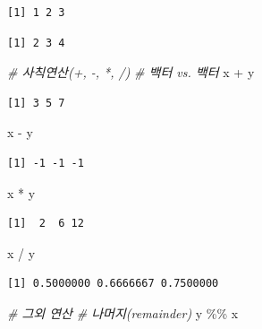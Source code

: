\documentclass[
  11pt,
]{krantz}
\newenvironment{Shaded}{\begin{snugshade}}{\end{snugshade}}
\newcommand{\CommentTok}[1]{\textcolor[rgb]{0.37,0.37,0.37}{\textit{#1}}}
\newcommand{\NormalTok}[1]{#1}
\newcommand{\SpecialCharTok}[1]{\textcolor[rgb]{0,0,0}{#1}}
\begin{document}
\begin{verbatim}
[1] 1 2 3
\end{verbatim}

\begin{verbatim}
[1] 2 3 4
\end{verbatim}

\begin{Shaded}
\begin{Highlighting}[]
\CommentTok{\# 사칙연산(+, {-}, *, /)}
\CommentTok{\# 백터 vs. 백터}
\NormalTok{x }\SpecialCharTok{+}\NormalTok{ y}
\end{Highlighting}
\end{Shaded}

\begin{verbatim}
[1] 3 5 7
\end{verbatim}

\begin{Shaded}
\begin{Highlighting}[]
\NormalTok{x }\SpecialCharTok{{-}}\NormalTok{ y}
\end{Highlighting}
\end{Shaded}

\begin{verbatim}
[1] -1 -1 -1
\end{verbatim}

\begin{Shaded}
\begin{Highlighting}[]
\NormalTok{x }\SpecialCharTok{*}\NormalTok{ y}
\end{Highlighting}
\end{Shaded}

\begin{verbatim}
[1]  2  6 12
\end{verbatim}

\begin{Shaded}
\begin{Highlighting}[]
\NormalTok{x }\SpecialCharTok{/}\NormalTok{ y}
\end{Highlighting}
\end{Shaded}

\begin{verbatim}
[1] 0.5000000 0.6666667 0.7500000
\end{verbatim}

\begin{Shaded}
\begin{Highlighting}[]
\CommentTok{\# 그외 연산}
\CommentTok{\# 나머지(remainder)}
\NormalTok{y }\SpecialCharTok{\%\%}\NormalTok{ x}
\end{Highlighting}
\end{Shaded}
\end{document}
